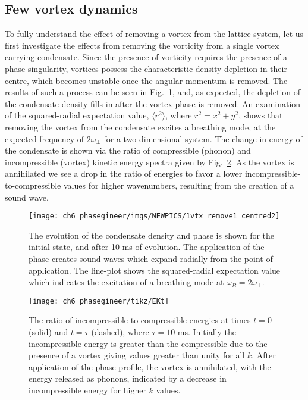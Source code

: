 \subsection{Few vortex dynamics}

To fully understand the effect of removing a vortex from the lattice system, let us first investigate the effects from removing the vorticity from a single vortex carrying condensate. Since the presence of vorticity requires the presence of a phase singularity, vortices possess the characteristic density depletion in their centre, which becomes unstable once the angular momentum is removed. The results of such a process can be seen in Fig.~\ref{fig:annihilation_1vtx}, and, as expected, the depletion of the condensate density fills in after the vortex phase is removed. An examination of the squared-radial expectation value, $\langle r^2 \rangle$, where $r^2 = x^2 + y^2$, shows that removing the vortex from the condensate excites a breathing mode, at the expected frequency of $2\omega_\perp$ for a two-dimensional system. The change in energy of the condensate is shown via the ratio of compressible (phonon) and incompressible (vortex) kinetic energy spectra given by Fig.~\ref{fig:kinspec}. As the vortex is annihilated we see a drop in the ratio of energies to favor a lower incompressible-to-compressible values for higher wavenumbers, resulting from the creation of a sound wave.

\begin{figure}[H] \centering
    \texttt{[image: ch6\_phasegineer/imgs/NEWPICS/1vtx\_remove1\_centred2]}
    \caption{The evolution of the condensate density and phase is shown for the initial state, and after 10 ms of evolution. The application of the phase creates sound waves which expand radially from the point of application. The line-plot shows the squared-radial expectation value which indicates the excitation of a breathing mode at $\omega_B = 2\omega_\perp$.}\label{fig:annihilation_1vtx}
\end{figure}

\begin{figure}[H] \centering
    \texttt{[image: ch6\_phasegineer/tikz/EKt]}
    \caption{The ratio of incompressible to compressible energies at times $t=0$ (solid) and $t=\tau$ (dashed), where $\tau=10$ ms. Initially the incompressible energy is greater than the compressible due to the presence of a vortex giving values greater than unity for all $k$. After application of the phase profile, the vortex is annihilated, with the energy released as phonons, indicated by a decrease in incompressible energy for higher $k$ values.}\label{fig:kinspec}
\end{figure}

